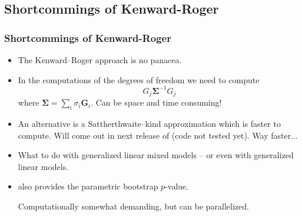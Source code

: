\documentclass[compress]{beamer}\usepackage[]{graphicx}\usepackage[]{color}
\def\Sigmab{\bm{\Sigma}}
\newenvironment{sframe}
{\begin{frame} [containsverbatim] }
  {\end{frame}}
\begin{document}
\subsection{Shortcommings of Kenward-Roger}
\begin{sframe}
\frametitle{Shortcommings of Kenward-Roger}

\begin{itemize}
\item The Kenward--Roger approach is no panacea.
\item In the computations of the degrees of freedom we need to compute
  \begin{displaymath}
    G_j {\bm \Sigma}^{-1} G_j
  \end{displaymath}
  where $\Sigmab= \sum_i \sigma_i \bm G_i$. 
  Can be space and time consuming!
\item An alternative is a Sattherthwaite--kind approximation which is faster to
  compute. Will come out in next release of  (code not tested yet). 
  Way faster...

\item What to do with generalized linear mixed models -- or even
  with generalized linear models.
  
\item 
   also provides the parametric bootstrap $p$-value. 
  
  Computationally somewhat demanding, but can be parallelized. 
\end{itemize}

  
\end{sframe}
\end{document}
